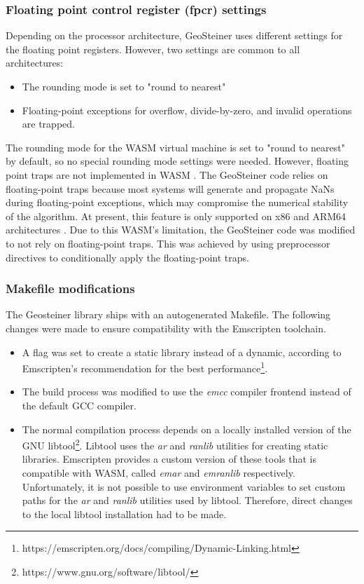 \documentclass{l4proj}
\begin{document}
\subsubsection{Floating point control register (fpcr) settings}
Depending on the processor architecture, GeoSteiner uses different settings for the floating point registers. However, two settings are common to all architectures:
\begin{itemize}
    \item The rounding mode is set to "round to nearest"
    \item Floating-point exceptions for overflow, divide-by-zero, and invalid operations are trapped.
\end{itemize}

The rounding mode for the WASM virtual machine is set to "round to nearest" by default, so no special rounding mode settings were needed. However, floating point traps are not implemented in WASM \citep{WASM_faqs}. The GeoSteiner code relies on floating-point traps because most systems will generate and propagate NaNs during floating-point exceptions, which may compromise the numerical stability of the algorithm. At present, this feature is only supported on x86 and ARM64 architectures \citep{Geosteiner_manual}.
Due to this WASM's limitation, the GeoSteiner code was modified to not rely on floating-point traps. This was achieved by using preprocessor directives to conditionally apply the floating-point traps.

\subsubsection{Makefile modifications}
The Geosteiner library ships with an autogenerated Makefile. The following changes were made to ensure compatibility with the Emscripten toolchain.
\begin{itemize}
    \item A flag was set to create a static library instead of a dynamic, according to Emscripten's recommendation for the best performance\footnote{https://emscripten.org/docs/compiling/Dynamic-Linking.html}.
    \item The build process was modified to use the \textit{emcc} compiler frontend instead of the default GCC compiler.
    \item The normal compilation process depends on a locally installed version of the GNU libtool\footnote{https://www.gnu.org/software/libtool/}. Libtool uses the \textit{ar} and \textit{ranlib} utilities for creating static libraries. Emscripten provides a custom version of these tools that is compatible with WASM, called \textit{emar} and \textit{emranlib} respectively. Unfortunately, it is not possible to use environment variables to set custom paths for the \textit{ar} and \textit{ranlib} utilities used by libtool. Therefore, direct changes to the local libtool installation had to be made.
\end{itemize}
\end{document}
